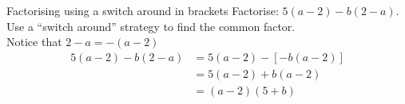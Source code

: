 
% 

\begin{wex}{Factorising using a switch around in brackets }{Factorise: $5(a-2)-b(2-a)$. }
{
Use a ``switch around'' strategy to find the common factor. \\Notice that $2-a = -(a-2)$ 
\begin{align*}
  5(a-2)-b(2-a) &= 5(a-2)-[-b(a-2)] \\
  &= 5(a-2)+b(a-2) \\
  &= (a-2)(5+b)
\end{align*}
}
\end{wex}
% 
% 

